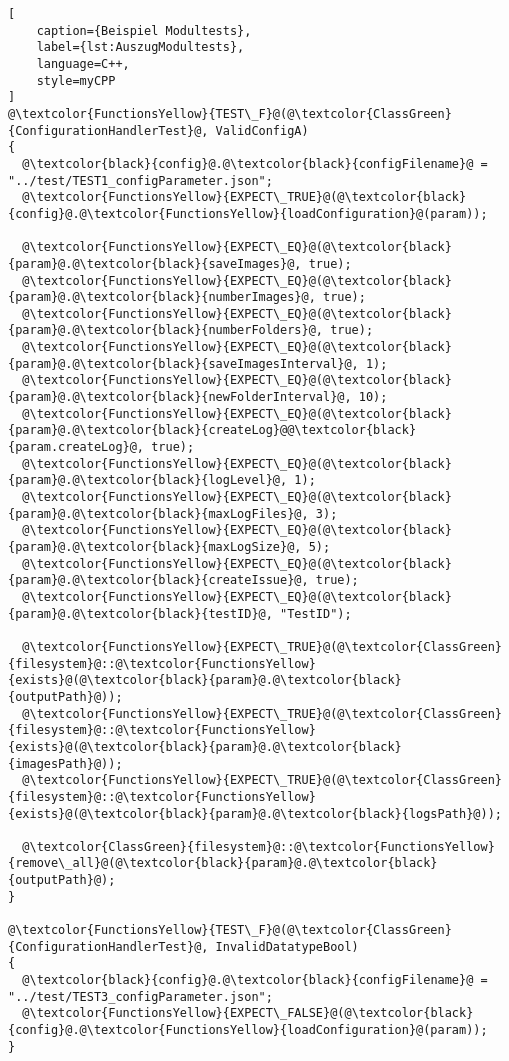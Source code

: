 \begin{lstlisting}[
    caption={Beispiel Modultests},
    label={lst:AuszugModultests},
    language=C++,
    style=myCPP
]
@\textcolor{FunctionsYellow}{TEST\_F}@(@\textcolor{ClassGreen}{ConfigurationHandlerTest}@, ValidConfigA)
{
  @\textcolor{black}{config}@.@\textcolor{black}{configFilename}@ = "../test/TEST1_configParameter.json";
  @\textcolor{FunctionsYellow}{EXPECT\_TRUE}@(@\textcolor{black}{config}@.@\textcolor{FunctionsYellow}{loadConfiguration}@(param));

  @\textcolor{FunctionsYellow}{EXPECT\_EQ}@(@\textcolor{black}{param}@.@\textcolor{black}{saveImages}@, true);
  @\textcolor{FunctionsYellow}{EXPECT\_EQ}@(@\textcolor{black}{param}@.@\textcolor{black}{numberImages}@, true);
  @\textcolor{FunctionsYellow}{EXPECT\_EQ}@(@\textcolor{black}{param}@.@\textcolor{black}{numberFolders}@, true);
  @\textcolor{FunctionsYellow}{EXPECT\_EQ}@(@\textcolor{black}{param}@.@\textcolor{black}{saveImagesInterval}@, 1);
  @\textcolor{FunctionsYellow}{EXPECT\_EQ}@(@\textcolor{black}{param}@.@\textcolor{black}{newFolderInterval}@, 10);
  @\textcolor{FunctionsYellow}{EXPECT\_EQ}@(@\textcolor{black}{param}@.@\textcolor{black}{createLog}@@\textcolor{black}{param.createLog}@, true);
  @\textcolor{FunctionsYellow}{EXPECT\_EQ}@(@\textcolor{black}{param}@.@\textcolor{black}{logLevel}@, 1);
  @\textcolor{FunctionsYellow}{EXPECT\_EQ}@(@\textcolor{black}{param}@.@\textcolor{black}{maxLogFiles}@, 3);
  @\textcolor{FunctionsYellow}{EXPECT\_EQ}@(@\textcolor{black}{param}@.@\textcolor{black}{maxLogSize}@, 5);
  @\textcolor{FunctionsYellow}{EXPECT\_EQ}@(@\textcolor{black}{param}@.@\textcolor{black}{createIssue}@, true);
  @\textcolor{FunctionsYellow}{EXPECT\_EQ}@(@\textcolor{black}{param}@.@\textcolor{black}{testID}@, "TestID");

  @\textcolor{FunctionsYellow}{EXPECT\_TRUE}@(@\textcolor{ClassGreen}{filesystem}@::@\textcolor{FunctionsYellow}{exists}@(@\textcolor{black}{param}@.@\textcolor{black}{outputPath}@));
  @\textcolor{FunctionsYellow}{EXPECT\_TRUE}@(@\textcolor{ClassGreen}{filesystem}@::@\textcolor{FunctionsYellow}{exists}@(@\textcolor{black}{param}@.@\textcolor{black}{imagesPath}@));
  @\textcolor{FunctionsYellow}{EXPECT\_TRUE}@(@\textcolor{ClassGreen}{filesystem}@::@\textcolor{FunctionsYellow}{exists}@(@\textcolor{black}{param}@.@\textcolor{black}{logsPath}@));

  @\textcolor{ClassGreen}{filesystem}@::@\textcolor{FunctionsYellow}{remove\_all}@(@\textcolor{black}{param}@.@\textcolor{black}{outputPath}@);
}

@\textcolor{FunctionsYellow}{TEST\_F}@(@\textcolor{ClassGreen}{ConfigurationHandlerTest}@, InvalidDatatypeBool)
{
  @\textcolor{black}{config}@.@\textcolor{black}{configFilename}@ = "../test/TEST3_configParameter.json";
  @\textcolor{FunctionsYellow}{EXPECT\_FALSE}@(@\textcolor{black}{config}@.@\textcolor{FunctionsYellow}{loadConfiguration}@(param));
}
\end{lstlisting}

